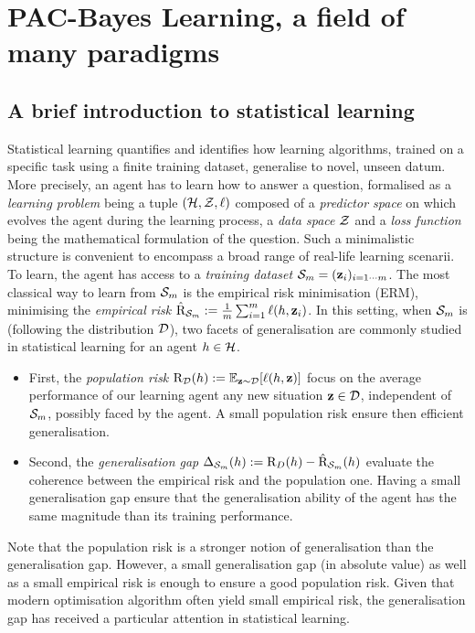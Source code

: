 \chapter[PAC-Bayes Learning, a field of many paradigms]{PAC-Bayes Learning, a field of many paradigms}
\label{chap:intro-pac-bayes}

\minitoc

\addchapterlof
\addchapterloa
\addchapterloe

\section{A brief introduction to statistical learning}
\label{sec: intro-stat-learning}
Statistical learning \citep{vapnik1999overview,james2013introduction} quantifies and identifies how learning algorithms, trained on a specific task using a finite training dataset, generalise to novel, unseen datum. More precisely, an agent has to learn how to answer a question, formalised as a \emph{learning problem} being a tuple $(\H,\Z,\ell)$ composed of a \emph{predictor space} on which evolves the agent during the learning process, a \emph{data space} $\Z$ and a \emph{loss function} being the mathematical formulation of the question. Such a minimalistic structure is convenient to encompass a broad range of real-life learning scenarii. To learn, the agent has access to a \emph{training dataset} $\S_m= (\z_i)_{i=1\cdots m}$. The most classical way to learn from $\Sm$ is the empirical risk minimisation (ERM), minimising the \emph{empirical risk} $\Riskhat_{\Sm}:= \frac{1}{m} \sum_{i=1}^m \ell(h,\z_i)$. In this setting, when $\S_m$ is \iid (following the distribution $\D$), two facets of generalisation are commonly studied in statistical learning for an agent $h\in\H$.

\begin{itemize}
    \item First, the \emph{population risk} $\Risk_\D(h):= \mathbb{E}_{\z\sim\D}[\ell(h,\z)]$ focus on the average performance of our learning agent \wrt any new situation $\z\in\D$, independent of $\S_m$, possibly faced by the agent. A small population risk ensure then efficient generalisation.   
    \item Second, the \emph{generalisation gap}  $\Delta_{\Sm}(h):= \Risk_D(h) - \Riskhat_{\Sm}(h)$ evaluate the coherence between the empirical risk and the population one. Having a small generalisation gap ensure that the generalisation ability of the agent has the same magnitude than its training performance. 
\end{itemize}
Note that the population risk is a stronger notion of generalisation than the generalisation gap. However, a small generalisation gap (in absolute value) as well as a small empirical risk is enough to ensure a good population risk. Given that modern optimisation algorithm often yield small empirical risk, the generalisation gap has received a particular attention in statistical learning. 

